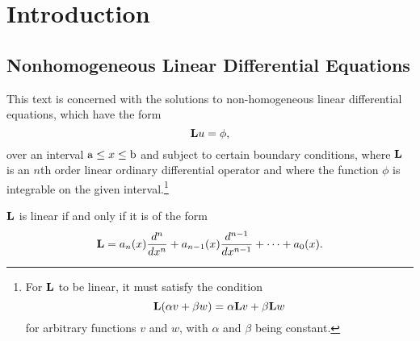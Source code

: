 \section{Introduction}
\subsection{Nonhomogeneous Linear Differential Equations}
This text is concerned with the solutions to non-homogeneous linear differential equations, which have the form
\begin{equation}
    \mathrm{\bf{L}} u=\phi,
\end{equation}
over an interval \(\mathrm{a} \leq x \leq \mathrm{b}\) and subject to certain boundary conditions, where \(\mathrm{\bf{L}}\) is an \(n\)th order linear ordinary differential operator and where the function \(\phi\) is integrable on the given interval.\footnote{For \(\mathrm{\bf{L}}\) to be linear, it must satisfy the condition
\begin{equation}\label{eq:linearity}
	\mathrm{\bf{L}}(\alpha v + \beta w) = \alpha \mathrm{\bf{L}} v + \beta \mathrm{\bf{L}} w
\end{equation}
for arbitrary functions \(v\) and \(w\), with \(\alpha\) and \(\beta\) being constant.} 


\begin{theorem}
	\(\mathrm{\bf{L}}\) is linear if and only if it is of the form
	\begin{equation} 
		\mathrm{\bf{L}} = a_n(x) \frac{d^n}{dx^n} + a_{n-1}(x) \frac{d^{n-1}}{dx^{n-1}} + \cdots + a_0(x).
	\end{equation}
\end{theorem}

